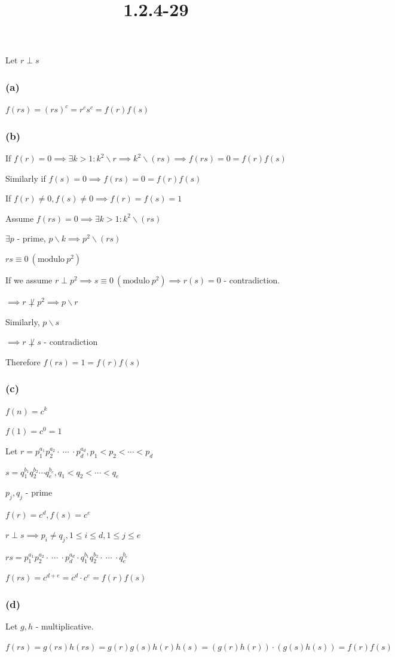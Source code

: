 \documentclass{article}
\title{1.2.4-29}
\begin{document}
\maketitle

Let $r \perp s$

\subsubsection*{(a)}

$f(rs) = (rs)^c=r^cs^c = f(r)f(s)$

\subsubsection*{(b)}

If $f(r) = 0 \implies \exists k > 1: k^2 \backslash r \implies k^2 \backslash (rs) \implies f(rs) = 0 = f(r)f(s)$

Similarly if $f(s) = 0 \implies f(rs) = 0 = f(r)f(s)$

If $f(r) \neq 0, f(s) \neq 0 \implies f(r)=f(s)=1$

Assume $f(rs) = 0 \implies \exists k > 1: k^2 \backslash (rs)$

$\exists p$ - prime, $p \backslash k \implies p^2 \backslash (rs)$

$rs \equiv 0 \ (\mathrm{modulo}\ p^2)$

If we assume $r \perp p^2 \implies s \equiv 0 \ (\mathrm{modulo}\ p^2) \implies r(s) = 0$ - contradiction.

$\implies r \not\perp p^2 \implies p \backslash r$

Similarly, $p \backslash s$

$\implies r \not\perp s$ - contradiction

Therefore $f(rs) = 1 = f(r)f(s)$

\subsubsection*{(c)}

$f(n) = c^k$

$f(1) = c^0 = 1$

Let $r = p_1^{a_1} p_2^{a_2} \cdot\ \cdots\ \cdot p_d^{a_d}, p_1 < p_2 < \cdots < p_d$

$s = q_1^{b_1} q_2^{b_2} \cdots q_e^{b_e}, q_1 < q_2 < \cdots < q_e$

$p_j, q_j$ - prime

$f(r) = c^d, f(s)=c^e$

$r \perp s \implies p_i \neq q_j, 1 \leq i \leq d, 1 \leq j \leq e$

$rs = p_1^{a_1} p_2^{a_2} \cdot\ \cdots\ \cdot p_d^{a_d} \cdot q_1^{b_1} q_2^{b_2} \cdot\ \cdots\ \cdot q_e^{b_e}$

$f(rs) = c^{d+e} = c^d \cdot c^e = f(r)f(s)$

\subsubsection*{(d)}

Let $g,h$ - multiplicative.

$f(rs) = g(rs)h(rs) = g(r)g(s)h(r)h(s) = (g(r)h(r))\cdot(g(s)h(s)) = f(r)f(s)$
\end{document}
